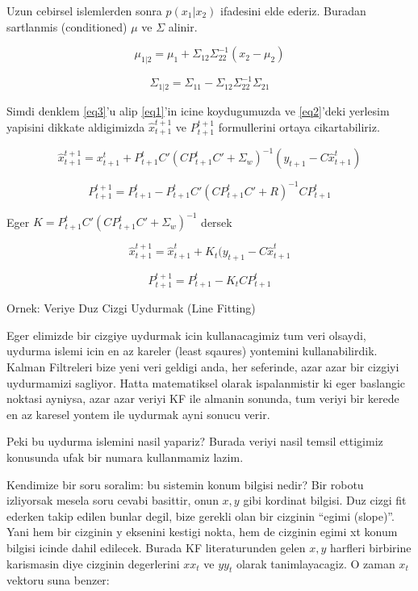 \documentclass[12pt,fleqn]{article}
\begin{document}
Uzun cebirsel islemlerden sonra $p(x_1|x_2)$ ifadesini elde ederiz. Buradan
sartlanmis (conditioned) $\mu$ ve $\Sigma$ alinir.

\begin{equation}\label{eq3}
\mu_{1|2} = \mu_1 + \Sigma_{12}\Sigma_{22}^{-1}(x_2 - \mu_2) 
\end{equation}


\[ \Sigma_{1|2} = \Sigma_{11}- \Sigma_{12}\Sigma_{22}^{-1}\Sigma_{21} \]

Simdi denklem \ref{eq3}'u alip \ref{eq1}'in icine koydugumuzda ve
\ref{eq2}'deki yerlesim yapisini dikkate aldigimizda $\hat{x}_{t+1}^{t+1}$
ve $P_{t+1}^{t+1}$ formullerini ortaya cikartabiliriz. 

\[ \hat{x}_{t+1}^{t+1} =  x_{t+1}^{t} +  P_{t+1}^{t}C'(CP_{t+1}^{t}C' + \Sigma_w)^{-1}
(y_{t+1}- C\hat{x}_{t+1}^t)
\]

\[ P_{t+1}^{t+1} = P_{t+1}^{t} - P_{t+1}^{t} C'(CP_{t+1}^{t} C'+R)^{-1}CP_{t+1}^{t} 
\]

Eger $K = P_{t+1}^{t}C'(CP_{t+1}^{t}C' + \Sigma_w)^{-1}$ dersek

\[  \hat{x}_{t+1}^{t+1}  =  \hat{x}_{t+1}^{t} + K_t (y_{t+1} - C \hat{x}_{t+1}^{t}  \]

\[  P_{t+1}^{t+1} =  P_{t+1}^{t} - K_tC P_{t+1}^{t} \]

Ornek: Veriye Duz Cizgi Uydurmak (Line Fitting)

Eger elimizde bir cizgiye uydurmak icin kullanacagimiz tum veri olsaydi,
uydurma islemi icin en az kareler (least sqaures) yontemini
kullanabilirdik.  Kalman Filtreleri bize yeni veri geldigi anda, her
seferinde, azar azar bir cizgiyi uydurmamizi sagliyor. Hatta matematiksel
olarak ispalanmistir ki eger baslangic noktasi ayniysa, azar azar veriyi KF
ile almanin sonunda, tum veriyi bir kerede en az karesel yontem ile
uydurmak ayni sonucu verir.

Peki bu uydurma islemini nasil yapariz? Burada veriyi nasil temsil ettigimiz
konusunda ufak bir numara kullanmamiz lazim.

Kendimize bir soru soralim: bu sistemin konum bilgisi nedir? Bir robotu
izliyorsak mesela soru cevabi basittir, onun $x, y$ gibi kordinat
bilgisi. Duz cizgi fit ederken takip edilen bunlar degil, bize gerekli olan
bir cizginin ``egimi (slope)''. Yani hem bir cizginin y eksenini kestigi
nokta, hem de cizginin egimi xt konum bilgisi icinde dahil edilecek. Burada
KF literaturunden gelen $x, y$ harfleri birbirine karismasin diye cizginin
degerlerini $xx_t$ ve $yy_t$ olarak tanimlayacagiz. O zaman $x_t$ vektoru suna
benzer:
\end{document}
